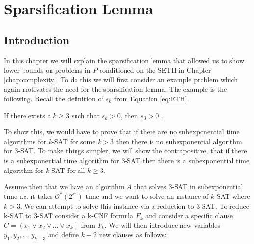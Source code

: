 \chapter{Sparsification Lemma} \label{chap:sparsication}

\ifpdf
    \graphicspath{{Chapter4/Figs/Raster/}{Chapter4/Figs/PDF/}{Chapter4/Figs/}}
\else
    \graphicspath{{Chapter4/Figs/Vector/}{Chapte4/Figs/}}
\fi



\section*{Introduction}
In this chapter we will explain the sparsification lemma that allowed
us to show lower bounds on problems in $P$ conditioned on the SETH in Chapter \ref{chap:complexity}.
To do this we will first consider an example problem which again motivates the need
for the sparsification lemma. The example is the following.
Recall the definition of $s_k$ from Equation \ref{eq:ETH}.
\begin{theorem}
    If there exists a $k \geq 3$ such that $s_k > 0$, then $s_3 > 0$ \cite{impagliazzo2001complexity}.
\end{theorem}
To show this, we would have to prove that if there are no subexponential
time algorithms for $k$-SAT for some $k > 3$ then there is no subexponential algorithm for 3-SAT.
To make things simpler, we will show the contrapositive, that if there is a subexponential time algorithm
for 3-SAT then there is a subexponential time algorithm for $k$-SAT for all $k \geq 3$.

Assume then that we have an algorithm $A$ that solves 3-SAT in subexponential time
i.e. it takes $\mathcal{O}^{\ast}(2^{\epsilon n})$ time and we want to solve an
instance of $k$-SAT where $k > 3$. We can attempt to solve this
instance via a reduction to 3-SAT.
To reduce k-SAT to 3-SAT consider a k-CNF formula $F_{k}$ and consider a specific clause
$C = (x_{1} \lor x_{2} \lor \ldots \lor x_{k})$ from $F_k$. We will then introduce new variables
$y_{1}, y_{2}, \ldots, y_{k-3}$ and define $k-2$ new clauses as follows:

